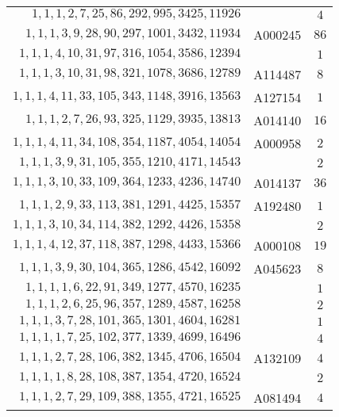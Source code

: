 \begin{longtabu}{|r|l|c|}
    \(    1,    1,    1,    2,    7,   25,   86,  292,  995, 3425,11926\) &	& \(4\)\\
    \(    1,    1,    1,    3,    9,   28,   90,  297, 1001, 3432,11934\) &	A000245 & \(86\)\\
    \(    1,    1,    1,    4,   10,   31,   97,  316, 1054, 3586,12394\) &	& \(1\)\\
    \(    1,    1,    1,    3,   10,   31,   98,  321, 1078, 3686,12789\) &	A114487 & \(8\)\\
    \(    1,    1,    1,    4,   11,   33,  105,  343, 1148, 3916,13563\) &	A127154 & \(1\)\\
    \(    1,    1,    1,    2,    7,   26,   93,  325, 1129, 3935,13813\) &	A014140 & \(16\)\\
    \(    1,    1,    1,    4,   11,   34,  108,  354, 1187, 4054,14054\) &	A000958 & \(2\)\\
    \(    1,    1,    1,    3,    9,   31,  105,  355, 1210, 4171,14543\) &	& \(2\)\\
    \(    1,    1,    1,    3,   10,   33,  109,  364, 1233, 4236,14740\) &	A014137& \(36\)\\
    \(    1,    1,    1,    2,    9,   33,  113,  381, 1291, 4425,15357\) &	A192480& \(1\)\\
    \(    1,    1,    1,    3,   10,   34,  114,  382, 1292, 4426,15358\) &	& \(2\)\\
    \(    1,    1,    1,    4,   12,   37,  118,  387, 1298, 4433,15366\) &	A000108 & \(19\)\\
    \(    1,    1,    1,    3,    9,   30,  104,  365, 1286, 4542,16092\) &	A045623 & \(8\)\\
    \(    1,    1,    1,    1,    6,   22,   91,  349, 1277, 4570,16235\) &	& \(1\)\\
    \(    1,    1,    1,    2,    6,   25,   96,  357, 1289, 4587,16258\) &	& \(2\)\\
    \(    1,    1,    1,    3,    7,   28,  101,  365, 1301, 4604,16281\) &	& \(1\)\\
    \(    1,    1,    1,    1,    7,   25,  102,  377, 1339, 4699,16496\) &	& \(4\)\\
    \(    1,    1,    1,    2,    7,   28,  106,  382, 1345, 4706,16504\) &	A132109 & \(4\)\\
    \(    1,    1,    1,    1,    8,   28,  108,  387, 1354, 4720,16524\) &	& \(2\)\\
    \(    1,    1,    1,    2,    7,   29,  109,  388, 1355, 4721,16525\) & A081494	& \(4\)\\

\end{longtabu}

